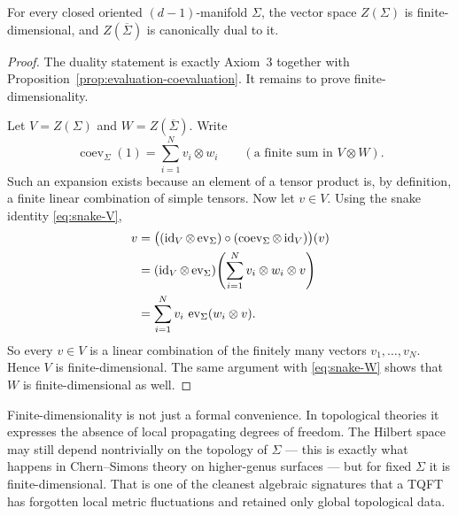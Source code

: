 \begin{corollary}\label{cor:finite-dimensionality}
For every closed oriented $(d-1)$-manifold $\Sigma$, the vector space $Z(\Sigma)$ is finite-dimensional, and $Z(\overline{\Sigma})$ is canonically dual to it.
\end{corollary}

\begin{proof}
The duality statement is exactly Axiom~3 together with Proposition~\ref{prop:evaluation-coevaluation}. It remains to prove finite-dimensionality.

\medskip

\noindent Let $V = Z(\Sigma)$ and $W = Z(\overline{\Sigma})$. Write
\begin{equation*}
\operatorname{coev}_{\Sigma}(1) = \sum_{i=1}^N v_i \otimes w_i
\qquad
(\text{a finite sum in } V \otimes W).
\end{equation*}
Such an expansion exists because an element of a tensor product is, by definition, a finite linear combination of simple tensors. Now let $v \in V$. Using the snake identity \eqref{eq:snake-V},
\begin{align*}
v
&=
\bigl((\operatorname{id}_V \otimes \operatorname{ev}_{\Sigma}) \circ (\operatorname{coev}_{\Sigma} \otimes \operatorname{id}_V)\bigr)(v) \\
&=
(\operatorname{id}_V \otimes \operatorname{ev}_{\Sigma})\!\left(\sum_{i=1}^N v_i \otimes w_i \otimes v\right) \\
&=
\sum_{i=1}^N v_i\, \operatorname{ev}_{\Sigma}(w_i \otimes v).
\end{align*}
So every $v \in V$ is a linear combination of the finitely many vectors $v_1,\ldots,v_N$. Hence $V$ is finite-dimensional. The same argument with \eqref{eq:snake-W} shows that $W$ is finite-dimensional as well.
\end{proof}

\begin{remark}\label{rem:fd-physics}
Finite-dimensionality is not just a formal convenience. In topological theories it expresses the absence of local propagating degrees of freedom. The Hilbert space may still depend nontrivially on the topology of $\Sigma$ --- this is exactly what happens in Chern--Simons theory on higher-genus surfaces --- but for fixed $\Sigma$ it is finite-dimensional. That is one of the cleanest algebraic signatures that a TQFT has forgotten local metric fluctuations and retained only global topological data.
\end{remark}

